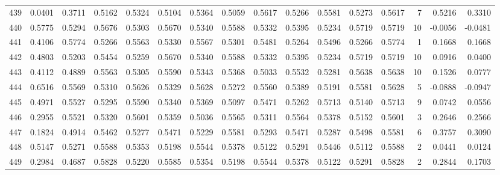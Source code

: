 \begin{tabular}{lrrrrrrrrrrrrrrr}
439 &      0.0401 &  0.3711 &  0.5162 &  0.5324 &  0.5104 &  0.5364 &  0.5059 &  0.5617 &  0.5266 &  0.5581 &   0.5273 &     0.5617 &      7 &                    0.5216 &                     0.3310 \\
440 &      0.5775 &  0.5294 &  0.5676 &  0.5303 &  0.5670 &  0.5340 &  0.5588 &  0.5332 &  0.5395 &  0.5234 &   0.5719 &     0.5719 &     10 &                   -0.0056 &                    -0.0481 \\
441 &      0.4106 &  0.5774 &  0.5266 &  0.5563 &  0.5330 &  0.5567 &  0.5301 &  0.5481 &  0.5264 &  0.5496 &   0.5266 &     0.5774 &      1 &                    0.1668 &                     0.1668 \\
442 &      0.4803 &  0.5203 &  0.5454 &  0.5259 &  0.5670 &  0.5340 &  0.5588 &  0.5332 &  0.5395 &  0.5234 &   0.5719 &     0.5719 &     10 &                    0.0916 &                     0.0400 \\
443 &      0.4112 &  0.4889 &  0.5563 &  0.5305 &  0.5590 &  0.5343 &  0.5368 &  0.5033 &  0.5532 &  0.5281 &   0.5638 &     0.5638 &     10 &                    0.1526 &                     0.0777 \\
444 &      0.6516 &  0.5569 &  0.5310 &  0.5626 &  0.5329 &  0.5628 &  0.5272 &  0.5560 &  0.5389 &  0.5191 &   0.5581 &     0.5628 &      5 &                   -0.0888 &                    -0.0947 \\
445 &      0.4971 &  0.5527 &  0.5295 &  0.5590 &  0.5340 &  0.5369 &  0.5097 &  0.5471 &  0.5262 &  0.5713 &   0.5140 &     0.5713 &      9 &                    0.0742 &                     0.0556 \\
446 &      0.2955 &  0.5521 &  0.5320 &  0.5601 &  0.5359 &  0.5036 &  0.5565 &  0.5311 &  0.5564 &  0.5378 &   0.5152 &     0.5601 &      3 &                    0.2646 &                     0.2566 \\
447 &      0.1824 &  0.4914 &  0.5462 &  0.5277 &  0.5471 &  0.5229 &  0.5581 &  0.5293 &  0.5471 &  0.5287 &   0.5498 &     0.5581 &      6 &                    0.3757 &                     0.3090 \\
448 &      0.5147 &  0.5271 &  0.5588 &  0.5353 &  0.5198 &  0.5544 &  0.5378 &  0.5122 &  0.5291 &  0.5446 &   0.5112 &     0.5588 &      2 &                    0.0441 &                     0.0124 \\
449 &      0.2984 &  0.4687 &  0.5828 &  0.5220 &  0.5585 &  0.5354 &  0.5198 &  0.5544 &  0.5378 &  0.5122 &   0.5291 &     0.5828 &      2 &                    0.2844 &                     0.1703 \\

\end{tabular}
